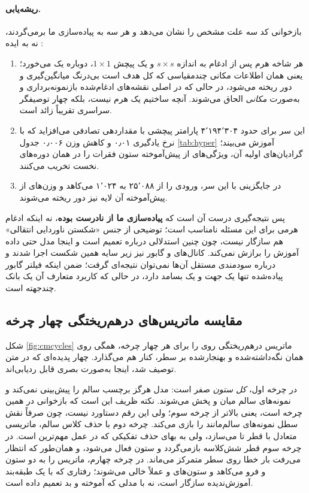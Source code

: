 \paragraph{ریشه‌یابی.} بازخوانی کد سه علت مشخص را نشان می‌دهد و هر سه به پیاده‌سازی ما برمی‌گردند، نه به ایده :
\begin{enumerate}[leftmargin=1.6em,itemsep=0.1em,topsep=0.2em]
    \item هر شاخه هرم پس از ادغام به اندازه $s \times s$ و یک پیچش $1\times1$، دوباره یک  می‌خورد؛ یعنی همان اطلاعات مکانی چندمقیاسی که کل هدف  است بی‌درنگ میانگین‌گیری و دور ریخته می‌شود، در حالی که در  اصلی نقشه‌های ادغام‌شده بازنمونه‌برداری و به‌صورت \emph{مکانی} الحاق می‌شوند. آنچه ساختیم یک هرم نیست، بلکه چهار توصیفگر سراسری تقریباً زائد است.
    \item این سر برای  حدود \num{۴٬۱۹۴٬۳۰۴} پارامتر پیچشی با مقداردهی تصادفی می‌افزاید که با نرخ یادگیری \num{۰٫۰۱} و کاهش وزن \num{۰٫۰۰۶} جدول \ref{tab:hyper} آموزش می‌بیند؛ گرادیان‌های اولیه آن، ویژگی‌های از پیش‌آموخته ستون فقرات را در همان دوره‌های نخست تخریب می‌کنند.
    \item در  جایگزینی  با این سر، ورودی  را از \num{۲۵٬۰۸۸} به \num{۱٬۰۲۴} می‌کاهد و وزن‌های از پیش‌آموخته آن لایه نیز دور ریخته می‌شوند.
\end{enumerate}
پس نتیجه‌گیری درست آن است که \textbf{پیاده‌سازی ما از  نادرست بوده}، نه اینکه ادغام هرمی برای این مسئله نامناسب است؛ توضیحی از جنس «شکستن ناوردایی انتقالی» هم سازگار نیست، چون چنین استدلالی درباره تعمیم است و اینجا مدل حتی داده آموزش را برازش نمی‌کند. کانال‌های  و گابور نیز زیر سایه همین شکست اجرا شدند و درباره سودمندی مستقل آن‌ها نمی‌توان نتیجه‌ای گرفت؛ ضمن اینکه فیلتر گابور پیاده‌شده تنها یک جهت و یک بسامد دارد، در حالی که کاربرد متعارف آن یک بانک چندجهته است.

\subsection{مقایسه ماتریس‌های درهم‌ریختگی چهار چرخه}
شکل \ref{fig:cmcycles} ماتریس درهم‌ریختگی  روی  را برای هر چهار چرخه، همگی روی همان  نگه‌داشته‌شده و بهنجارشده بر سطر، کنار هم می‌گذارد. چهار پدیده‌ای که در متن توصیف شد، اینجا به‌صورت بصری قابل ردیابی‌اند.

در چرخه اول، \emph{کل ستون}  صفر است: مدل هرگز برچسب سالم را پیش‌بینی نمی‌کند و نمونه‌های سالم میان  و  پخش می‌شوند. نکته ظریف این است که بازخوانی  در همین چرخه  است، یعنی بالاتر از چرخه سوم؛ ولی این رقم دستاورد نیست، چون  صرفاً نقش سطل نمونه‌های سالم‌مانند را بازی می‌کند. چرخه دوم با حذف کلاس سالم، ماتریسی متعادل با قطر  تا  می‌سازد، ولی به بهای حذف تفکیکی که در عمل مهم‌ترین است. در چرخه سوم قطر شش‌کلاسه بازمی‌گردد و ستون  فعال می‌شود، و همان‌طور که انتظار می‌رفت بار خطا روی سطر  متمرکز می‌ماند. در چرخه چهارم،  ماتریس را به دو ستون  و  فرو می‌کاهد و ستون‌های  و  عملاً خالی می‌شوند؛ رفتاری که با یک طبقه‌بند آموزش‌ندیده سازگار است، نه با مدلی که آموخته و بد تعمیم داده است.

